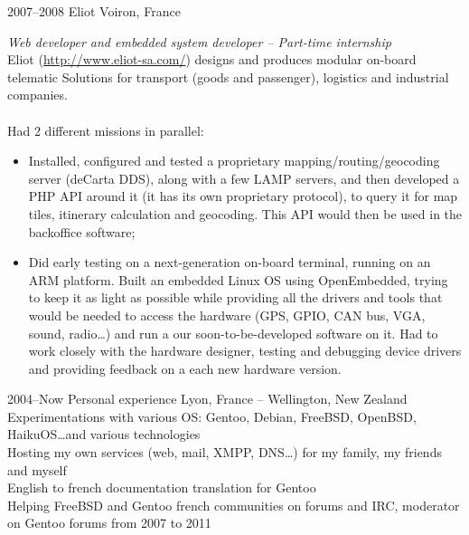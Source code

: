 \documentclass[]{friggeri-cv} %
\begin{document}
\begin{entrylist}
\entry
{2007--2008}
{Eliot}
{Voiron, France}
{\emph{Web developer and embedded system developer -- Part-time internship} \\
Eliot (\url{http://www.eliot-sa.com/}) designs and produces modular on-board telematic Solutions for transport (goods and passenger), logistics and industrial companies. \\
\\
Had 2 different missions in parallel:
\begin{itemize}
    \item Installed, configured and tested a proprietary mapping/routing/geocoding server (deCarta DDS), along with a few LAMP servers, and then developed a PHP API around it (it has its own proprietary protocol), to query it for map tiles, itinerary calculation and geocoding. This API would then be used in the backoffice software;
    \item Did early testing on a next-generation on-board terminal, running on an ARM platform. Built an embedded Linux OS using OpenEmbedded, trying to keep it as light as possible while providing all the drivers and tools that would be needed to access the hardware (GPS, GPIO, CAN bus, VGA, sound, radio\dots) and run a our soon-to-be-developed software on it. Had to work closely with the hardware designer, testing and debugging device drivers and providing feedback on a each new hardware version.
\end{itemize}}

\entry
{2004--Now}
{Personal experience}
{Lyon, France -- Wellington, New Zealand}
{Experimentations with various OS: Gentoo, Debian, FreeBSD, OpenBSD, HaikuOS\dots and various technologies \\
Hosting my own services (web, mail, XMPP, DNS\dots) for my family, my friends and myself \\
English to french documentation translation for Gentoo \\
Helping FreeBSD and Gentoo french communities on forums and IRC, moderator on Gentoo forums from 2007 to 2011}
\end{entrylist}

\newpage

\end{document}

